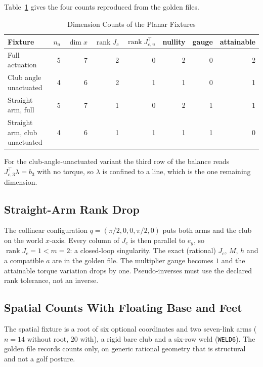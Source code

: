 \documentclass[11pt,a4paper]{article}
\newcommand{\rank}{\operatorname{rank}}
\begin{document}
Table~\ref{tab:dims} gives the four counts reproduced from the golden files.

\begin{table}[ht]
\centering
\caption{Dimension Counts of the Planar Fixtures}
\label{tab:dims}
\small
\begin{tabular}{@{}lrrrrrrr@{}}
\toprule
Fixture & $n_a$ & $\dim x$ & $\rank J_c$ & $\rank J_{c,u}^{\top}$ & nullity & gauge & attainable \\
\midrule
Full actuation        & 5 & 7 & 2 & 0 & 2 & 0 & 2 \\
Club angle unactuated & 4 & 6 & 2 & 1 & 1 & 0 & 1 \\
Straight arm, full    & 5 & 7 & 1 & 0 & 2 & 1 & 1 \\
Straight arm, club unactuated & 4 & 6 & 1 & 1 & 1 & 1 & 0 \\
\bottomrule
\end{tabular}
\end{table}

For the club-angle-unactuated variant the third row of the balance reads
$J_{c,3}^{\top}\lambda=b_3$ with no torque, so $\lambda$ is confined to a line,
which is the one remaining dimension.

\subsection{Straight-Arm Rank Drop}

The collinear configuration $q=(\pi/2,0,0,\pi/2,0)$ puts both arms and the club
on the world $x$-axis.  Every column of $J_c$ is then parallel to $e_y$, so
$\rank J_c=1<m=2$: a closed-loop singularity.  The exact (rational) $J_c$, $M$,
$h$ and a compatible $a$ are in the golden file.  The multiplier gauge becomes
$1$ and the attainable torque variation drops by one.  Pseudo-inverses must use
the declared rank tolerance, not an inverse.

\subsection{Spatial Counts With Floating Base and Feet}

The spatial fixture is a root of six optional coordinates and two seven-link
arms ($n=14$ without root, $20$ with), a rigid bare club and a six-row weld
(\texttt{WELD6}).  The golden file records counts only, on generic rational
geometry that is structural and not a golf posture.
\end{document}
